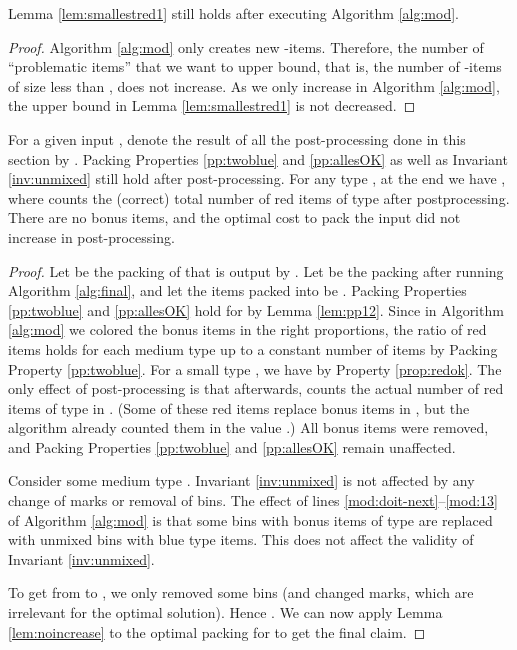 \begin{lemma}
Lemma \ref{lem:smallestred1} still holds after executing Algorithm \ref{alg:mod}.
\end{lemma}
\begin{proof}
Algorithm \ref{alg:mod} only creates new -items. Therefore, the number of ``problematic items'' that we want to upper bound, that is, the number of -items of size less than , does not increase. As we only increase  in Algorithm \ref{alg:mod}, the upper bound in Lemma \ref{lem:smallestred1} is not decreased.
\end{proof}

\begin{theorem}
	\label{thm:red-alpha}
	For a given input , denote the result of all the post-processing done in this section by . 
	Packing Properties \ref{pp:twoblue} and \ref{pp:allesOK} as well as Invariant \ref{inv:unmixed}
	still hold after post-processing.
	For any type , at the end we have ,
	where  counts the (correct) total number of red items of type  after postprocessing.
	There are no bonus items, and  the optimal cost to pack the input did not increase in post-processing.
\end{theorem}
\begin{proof}
	Let  be the packing of  that is output by .
	Let  be the packing after running Algorithm \ref{alg:final}, and let the items packed into  be .
	Packing Properties  \ref{pp:twoblue} and \ref{pp:allesOK} hold for   by Lemma \ref{lem:pp12}. Since in Algorithm \ref{alg:mod} we colored the bonus items in the right proportions,
	the ratio  of red items holds for each medium type  up to a constant number of items by Packing Property \ref{pp:twoblue}.
	For a small type , we have  by Property \ref{prop:redok}.
	The only effect of post-processing is that afterwards,  counts the actual number of red items of type  in .
	(Some of these red items replace bonus items in , but the algorithm already counted them in the value .)
All bonus items were removed, and Packing Properties  \ref{pp:twoblue} and \ref{pp:allesOK} remain unaffected.
	
	Consider some medium type . Invariant \ref{inv:unmixed} is not affected by any change of marks or removal of bins.
	The effect of lines \ref{mod:doit-next}--\ref{mod:13} of Algorithm \ref{alg:mod} is that some bins with bonus items
	of type  are replaced with unmixed bins with blue type  items.
	This does not affect the validity of Invariant \ref{inv:unmixed}.	
	
	To get from  to , we only removed some bins (and changed marks, which are irrelevant for the optimal solution).
	Hence . We can now apply Lemma \ref{lem:noincrease} to the optimal packing for  to get the final claim.
\end{proof}













